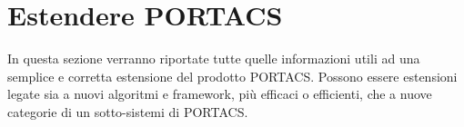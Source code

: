 \section{Estendere PORTACS}
In questa sezione verranno riportate tutte quelle informazioni utili ad una semplice e corretta estensione del prodotto PORTACS. Possono essere estensioni legate sia a nuovi algoritmi e framework, più efficaci o efficienti, che a nuove categorie di un sotto-sistemi di PORTACS.















